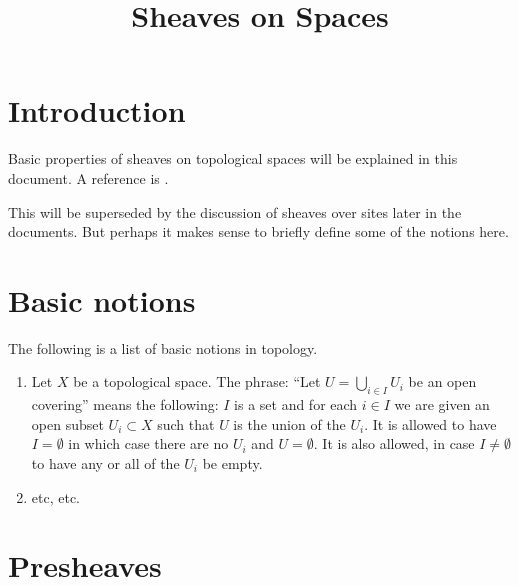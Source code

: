 \documentclass{stacks-project}
\theoremstyle{plain}
\theoremstyle{definition}
\theoremstyle{remark}
\numberwithin{equation}{subsection}
\begin{document}
\title{Sheaves on Spaces}


\maketitle

\label{section-phantom}

\tableofcontents

\section{Introduction}
\label{section-introduction}

\noindent
Basic properties of sheaves on topological spaces
will be explained in this document.
A reference is \cite{Godement}.

\medskip\noindent
This will be superseded by the discussion of sheaves
over sites later in the documents. But perhaps it makes
sense to briefly define some of the notions here.











\section{Basic notions}
\label{section-sheaves-basic}

\noindent
The following is a list of basic notions in topology.

\begin{enumerate}
\item Let $X$ be a topological space. The phrase: ``Let
$U = \bigcup_{i \in I} U_i$ be an open covering'' means the
following: $I$ is a set and for each $i \in I$ we are given
an open subset $U_i \subset X$ such that $U$ is the
union of the $U_i$. It is allowed to have $I = \emptyset$
in which case there are no $U_i$ and $U = \emptyset$.
It is also allowed, in case $I \not = \emptyset$ to have
any or all of the $U_i$ be empty.
\item etc, etc.
\end{enumerate}












\section{Presheaves}
\label{section-presheaves}
\end{document}
